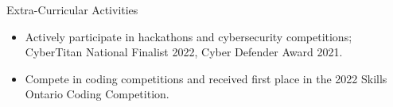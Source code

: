 \documentclass{resume}
\begin{document}
\begin{rSection}{Extra-Curricular Activities}
	\begin{itemize}
		\item 	Actively participate in hackathons and cybersecurity competitions; CyberTitan National Finalist 2022, Cyber Defender Award 2021.
		\item	Compete in coding competitions and received first place in the 2022 Skills Ontario Coding Competition.
	\end{itemize}
\end{rSection}
\end{document}
